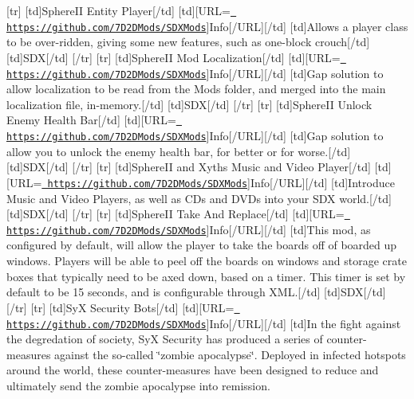 \mbox{[}tr\mbox{]} \mbox{[}td\mbox{]}Sphere\+II Entity Player\mbox{[}/td\mbox{]} \mbox{[}td\mbox{]}\mbox{[}U\+RL=\href{https://github.com/7D2DMods/SDXMods}{\texttt{ https\+://github.\+com/7\+D2\+D\+Mods/\+S\+D\+X\+Mods}}\mbox{]}Info\mbox{[}/\+U\+RL\mbox{]}\mbox{[}/td\mbox{]} \mbox{[}td\mbox{]}Allows a player class to be over-\/ridden, giving some new features, such as one-\/block crouch\mbox{[}/td\mbox{]} \mbox{[}td\mbox{]}S\+DX\mbox{[}/td\mbox{]} \mbox{[}/tr\mbox{]} \mbox{[}tr\mbox{]} \mbox{[}td\mbox{]}Sphere\+II Mod Localization\mbox{[}/td\mbox{]} \mbox{[}td\mbox{]}\mbox{[}U\+RL=\href{https://github.com/7D2DMods/SDXMods}{\texttt{ https\+://github.\+com/7\+D2\+D\+Mods/\+S\+D\+X\+Mods}}\mbox{]}Info\mbox{[}/\+U\+RL\mbox{]}\mbox{[}/td\mbox{]} \mbox{[}td\mbox{]}Gap solution to allow localization to be read from the Mods folder, and merged into the main localization file, in-\/memory.\mbox{[}/td\mbox{]} \mbox{[}td\mbox{]}S\+DX\mbox{[}/td\mbox{]} \mbox{[}/tr\mbox{]} \mbox{[}tr\mbox{]} \mbox{[}td\mbox{]}Sphere\+II Unlock Enemy Health Bar\mbox{[}/td\mbox{]} \mbox{[}td\mbox{]}\mbox{[}U\+RL=\href{https://github.com/7D2DMods/SDXMods}{\texttt{ https\+://github.\+com/7\+D2\+D\+Mods/\+S\+D\+X\+Mods}}\mbox{]}Info\mbox{[}/\+U\+RL\mbox{]}\mbox{[}/td\mbox{]} \mbox{[}td\mbox{]}Gap solution to allow you to unlock the enemy health bar, for better or for worse.\mbox{[}/td\mbox{]} \mbox{[}td\mbox{]}S\+DX\mbox{[}/td\mbox{]} \mbox{[}/tr\mbox{]} \mbox{[}tr\mbox{]} \mbox{[}td\mbox{]}Sphere\+II and Xyth\textquotesingle{}s Music and Video Player\mbox{[}/td\mbox{]} \mbox{[}td\mbox{]}\mbox{[}U\+RL=\href{https://github.com/7D2DMods/SDXMods}{\texttt{ https\+://github.\+com/7\+D2\+D\+Mods/\+S\+D\+X\+Mods}}\mbox{]}Info\mbox{[}/\+U\+RL\mbox{]}\mbox{[}/td\mbox{]} \mbox{[}td\mbox{]}Introduce Music and Video Players, as well as C\+Ds and D\+V\+Ds into your S\+DX world.\mbox{[}/td\mbox{]} \mbox{[}td\mbox{]}S\+DX\mbox{[}/td\mbox{]} \mbox{[}/tr\mbox{]} \mbox{[}tr\mbox{]} \mbox{[}td\mbox{]}Sphere\+II Take And Replace\mbox{[}/td\mbox{]} \mbox{[}td\mbox{]}\mbox{[}U\+RL=\href{https://github.com/7D2DMods/SDXMods}{\texttt{ https\+://github.\+com/7\+D2\+D\+Mods/\+S\+D\+X\+Mods}}\mbox{]}Info\mbox{[}/\+U\+RL\mbox{]}\mbox{[}/td\mbox{]} \mbox{[}td\mbox{]}This mod, as configured by default, will allow the player to take the boards off of boarded up windows. Players will be able to peel off the boards on windows and storage crate boxes that typically need to be axed down, based on a timer. This timer is set by default to be 15 seconds, and is configurable through X\+ML.\mbox{[}/td\mbox{]} \mbox{[}td\mbox{]}S\+DX\mbox{[}/td\mbox{]} \mbox{[}/tr\mbox{]} \mbox{[}tr\mbox{]} \mbox{[}td\mbox{]}SyX Security Bots\mbox{[}/td\mbox{]} \mbox{[}td\mbox{]}\mbox{[}U\+RL=\href{https://github.com/7D2DMods/SDXMods}{\texttt{ https\+://github.\+com/7\+D2\+D\+Mods/\+S\+D\+X\+Mods}}\mbox{]}Info\mbox{[}/\+U\+RL\mbox{]}\mbox{[}/td\mbox{]} \mbox{[}td\mbox{]}In the fight against the degredation of society, SyX Security has produced a series of counter-\/measures against the so-\/called \char`\"{}zombie apocalypse\char`\"{}. Deployed in infected hotspots around the world, these counter-\/measures have been designed to reduce and ultimately send the zombie apocalypse into remission.


